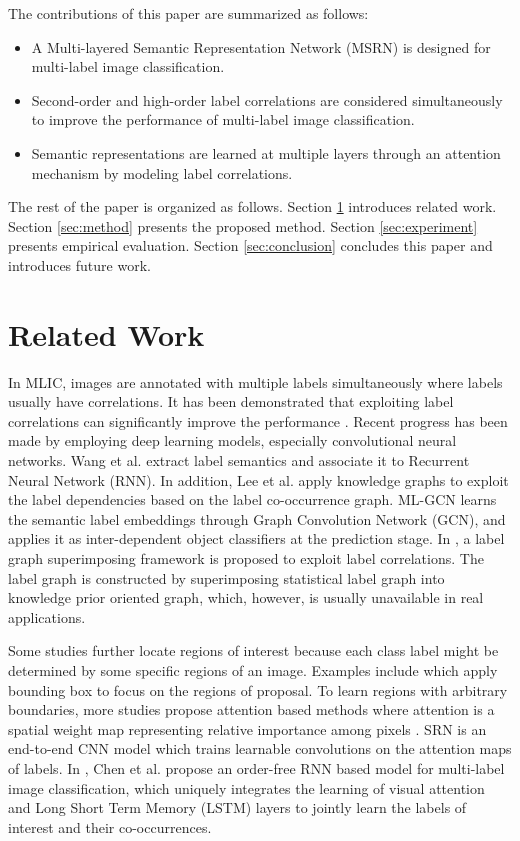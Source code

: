 \documentclass{article} \usepackage{nips14submit_e,times}
\begin{document}
The contributions of this paper are summarized as follows:
\begin{itemize}
    \item A Multi-layered Semantic Representation Network (MSRN) is designed for multi-label image classification.
    \item Second-order and high-order label correlations are considered simultaneously to improve the performance of multi-label image classification.
    \item Semantic representations are learned at multiple layers through an attention mechanism by modeling label correlations.
\end{itemize}



The rest of the paper is organized as follows. Section \ref{sec:relatedwork} introduces related work. Section \ref{sec:method} presents the proposed method. Section \ref{sec:experiment} presents empirical evaluation.
Section \ref{sec:conclusion} concludes this paper and introduces future work.

\section{Related Work}
\label{sec:relatedwork}
In MLIC, images are annotated with multiple labels simultaneously where labels usually have correlations.
It has been demonstrated that exploiting label correlations can significantly improve the performance \cite{TKDE14:MLZhang:MLReview}.
Recent progress has been made by employing deep learning models, especially convolutional neural networks. Wang et al. \cite{CVPR2016:ULMIC} extract label semantics and associate it to Recurrent Neural Network (RNN).
In addition,
Lee et al. \cite{CVPR2018:ZSL} apply knowledge graphs to exploit the label dependencies based on the
label co-occurrence graph.
ML-GCN \cite{CVPR2019:ML-GCN} learns the semantic label embeddings through Graph
Convolution Network (GCN),
and applies it as inter-dependent object classifiers at the prediction stage.
In \cite{AAAI2020:KSSNet}, a label graph superimposing framework is proposed to exploit label correlations. The label graph is constructed by superimposing statistical label graph into knowledge prior oriented graph, which, however, is usually unavailable in real applications.

Some studies further locate regions of interest because each class label might be determined by some specific regions of an image. Examples include \cite{ECCV2014:EB} \cite{CVPR2016:EBBA} which apply bounding box to focus on the regions of proposal. To learn regions with arbitrary boundaries, more studies propose attention based methods where attention is a spatial weight map representing relative importance among pixels \cite{ICLR2018:MLAtt}.
SRN \cite{CVPR2017:LSRIS} is an end-to-end CNN model
which trains learnable convolutions on the attention maps of labels.
In \cite{AAAI2018:OFRNN}, Chen et al. propose an order-free RNN based model
for multi-label image classification, which uniquely integrates the learning of visual attention and
Long Short Term Memory (LSTM) layers to jointly learn the labels of interest and their co-occurrences.
\end{document}
